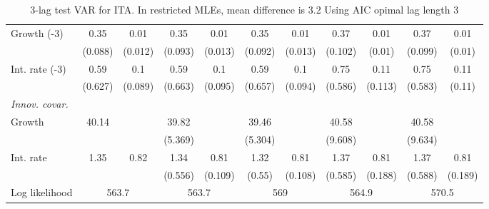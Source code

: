 \begin{table}[htbp]
\begin{tabular}{@{\extracolsep{4pt}}lcccccccccc@{}}
\quad Growth (-3) 	 &0.35 	 & 0.01 	 & 0.35 	 & 0.01 	 & 0.35 	 & 0.01 	 & 0.37 	 & 0.01 	 & 0.37 	 & 0.01	 \\ 
 		 & (0.088) 	 & (0.012) 	 & (0.093) 	 & (0.013) 	 & (0.092) 	 & (0.013) 	 & (0.102) 	 & (0.01) 	 & (0.099) 	 & (0.01) 	 \\ 
\quad Int. rate (-3) 	 &0.59 	 & 0.1 	 & 0.59 	 & 0.1 	 & 0.59 	 & 0.1 	 & 0.75 	 & 0.11 	 & 0.75 	 & 0.11	 \\ 
 		 & (0.627) 	 & (0.089) 	 & (0.663) 	 & (0.095) 	 & (0.657) 	 & (0.094) 	 & (0.586) 	 & (0.113) 	 & (0.583) 	 & (0.11) 	 \\ 
\rule{0pt}{4ex} \emph{Innov. covar.}  	 & 	 & 	 & 	 & 	 & 	 & 	 & 	 & 	 & 	 &\\ 
\quad Growth 	 &40.14 	 &  	 & 39.82 	 &  	 & 39.46 	 &  	 & 40.58 	 &  	 & 40.58 	 & 	 \\ 
 		 &  	 &  	 & (5.369) 	 &  	 & (5.304) 	 &  	 & (9.608) 	 &  	 & (9.634) 	 &  	 \\ 
\quad Int. rate 	 &1.35 	 & 0.82 	 & 1.34 	 & 0.81 	 & 1.32 	 & 0.81 	 & 1.37 	 & 0.81 	 & 1.37 	 & 0.81	 \\ 
 		 &  	 &  	 & (0.556) 	 & (0.109) 	 & (0.55) 	 & (0.108) 	 & (0.585) 	 & (0.188) 	 & (0.588) 	 & (0.189) 	 \\ 
 \hline \rule{0pt}{4ex} 
  Log likelihood 	 &\multicolumn{2}{c}{563.7} 	 & \multicolumn{2}{c}{563.7} 	 & \multicolumn{2}{c}{569} 	 & \multicolumn{2}{c}{564.9} 	 & \multicolumn{2}{c}{570.5}\\ 

 \hline 	\end{tabular}		\caption{3-lag test VAR for ITA. In restricted MLEs, mean difference is 3.2 Using AIC opimal lag length 3}
		\label{tab:ITAopt_}

\end{table}